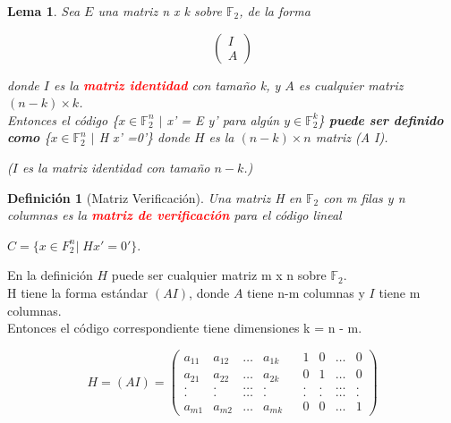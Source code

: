 \documentclass{beamer}
\theoremstyle{plain}
\newtheorem{definicion} [Definicion]{Definición}
\newtheorem{lema} [theorem] {Lema}
\theoremstyle{example}
\theoremstyle{example}
\begin{document}
\begin{frame}  \small  
\begin{lema}

Sea $E$ una matriz n x k sobre $\mathbb{F}_2$, de la forma

\[
  		\left( \begin{array}{c}
                  I \\
                  A   
           			\end{array}
    		\right) 	    		
\]

donde $I$ es la \textcolor{red}{\textbf{matriz identidad}} con tamaño k, y $A$ es cualquier matriz $(n - k) \times k$.\\
\vspace{0.2cm}
Entonces el código \{$x \in \mathbb{F}_2^n$ $|$ x' = \;E \;y' \; para algún $y \in \mathbb{F}_2^k$\} \textbf{puede ser definido como}  \{$x \in \mathbb{F}_2^n$ $|$ H x' =0'\} donde $H$ es la $(n - k) \times n$ matriz (A I).  
\vspace{0.2cm}

($I$ es la matriz identidad con tamaño $n - k$.)\\

\end{lema}


\end{frame} 

\begin{frame}  \small  

\begin{definicion}[Matriz Verificación]
Una matriz H en $\mathbb{F}_2$ con m filas y n columnas es la \textcolor{red}{\textbf{matriz de verificación}} para el código lineal

\begin{center}
$C = \{x \in F_2^n |\; Hx' = 0'\}.$
\end{center}
\end{definicion}

En la definición $H$ puede ser cualquier matriz m x n sobre $\mathbb{F}_2$.\\  
\vspace{0.2cm}
H tiene la forma estándar $(A I)$, donde $A$ tiene n-m columnas y $I$ tiene m columnas.\\ 
\vspace{0.2cm}
Entonces el código correspondiente tiene dimensiones k = n - m. 

\[
   H=  (A I) =     \left( \begin{array}{ccccccccc}
                  a_{11} & a_{12} & \ldots & a_{1k} & & 1 & 0 & \ldots & 0\\
                  a_{21} & a_{22} & \ldots & a_{2k} & & 0 & 1 & \ldots & 0\\
                  . & . & \ldots & . & & . & . & \ldots & .\\
                  . & . & \ldots & . & & . & . & \ldots & .\\
                  a_{m1} & a_{m2} & \ldots & a_{mk} & & 0 & 0 & \ldots & 1
           			\end{array}
    		\right) 	    		
\]

 \end{frame} 
\end{document}
